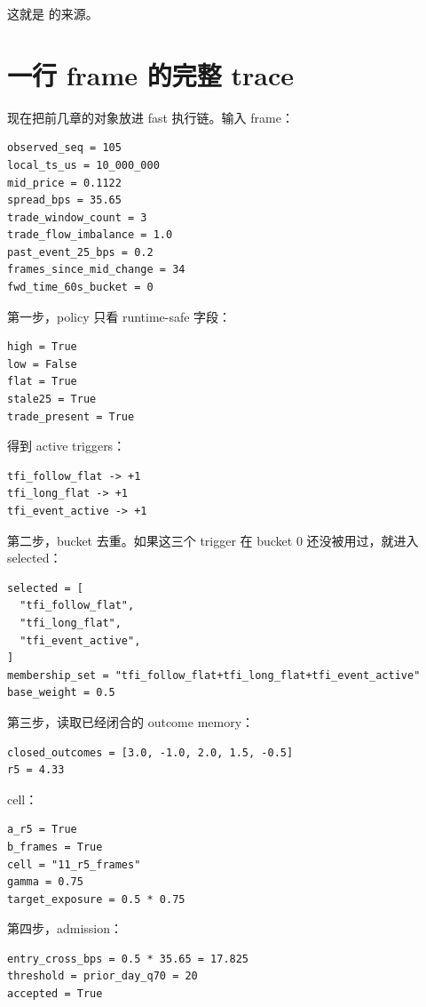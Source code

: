 这就是  的来源。

\section{一行 frame 的完整 trace}

现在把前几章的对象放进 fast 执行链。输入 frame：

\begin{lstlisting}
observed_seq = 105
local_ts_us = 10_000_000
mid_price = 0.1122
spread_bps = 35.65
trade_window_count = 3
trade_flow_imbalance = 1.0
past_event_25_bps = 0.2
frames_since_mid_change = 34
fwd_time_60s_bucket = 0
\end{lstlisting}

第一步，policy 只看 runtime-safe 字段：

\begin{lstlisting}
high = True
low = False
flat = True
stale25 = True
trade_present = True
\end{lstlisting}

得到 active triggers：

\begin{lstlisting}
tfi_follow_flat -> +1
tfi_long_flat -> +1
tfi_event_active -> +1
\end{lstlisting}

第二步，bucket 去重。如果这三个 trigger 在 bucket 0 还没被用过，就进入 selected：

\begin{lstlisting}
selected = [
  "tfi_follow_flat",
  "tfi_long_flat",
  "tfi_event_active",
]
membership_set = "tfi_follow_flat+tfi_long_flat+tfi_event_active"
base_weight = 0.5
\end{lstlisting}

第三步，读取已经闭合的 outcome memory：

\begin{lstlisting}
closed_outcomes = [3.0, -1.0, 2.0, 1.5, -0.5]
r5 = 4.33
\end{lstlisting}

cell：

\begin{lstlisting}
a_r5 = True
b_frames = True
cell = "11_r5_frames"
gamma = 0.75
target_exposure = 0.5 * 0.75
\end{lstlisting}

第四步，admission：

\begin{lstlisting}
entry_cross_bps = 0.5 * 35.65 = 17.825
threshold = prior_day_q70 = 20
accepted = True
\end{lstlisting}

